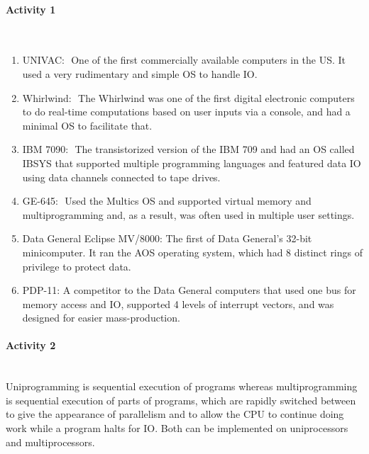 \documentclass{article}
\begin{document}
\paragraph{\Large Activity 1}\mbox{}\\
\begin{enumerate}
	\item UNIVAC:  One of the first commercially available computers in the US. It used a very rudimentary and simple OS to handle IO.
	\item Whirlwind:  The Whirlwind was one of the first digital electronic computers to do real-time computations based on user inputs via a console, and had a minimal OS to facilitate that.
	\item IBM 7090:  The transistorized version of the IBM 709 and had an OS called IBSYS that supported multiple programming languages and featured data IO using data channels connected to tape drives.
	\item GE-645:  Used the Multics OS and supported virtual memory and multiprogramming and, as a result, was often used in multiple user settings.
	\item Data General Eclipse MV/8000: The first of Data General's 32-bit minicomputer. It ran the AOS operating system, which had 8 distinct rings of privilege to protect data.
	\item PDP-11: A competitor to the Data General computers that used one bus for memory access and IO, supported 4 levels of interrupt vectors, and was designed for easier mass-production. 
\end{enumerate}

\paragraph{\Large Activity 2}\mbox{}\\
\indent Uniprogramming is sequential execution of programs whereas multiprogramming is sequential execution of parts of programs, which are rapidly switched between to give the appearance of parallelism and to allow the CPU to continue doing work while a program halts for IO. Both can be implemented on uniprocessors and multiprocessors.
	
\end{document}
